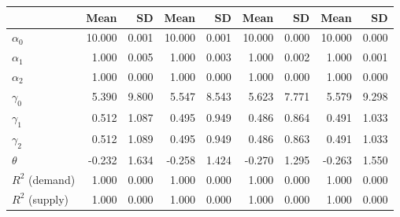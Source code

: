 
\begin{tabular}[t]{lrrrrrrrr}
\toprule
  & Mean & SD & Mean  & SD  & Mean   & SD   & Mean    & SD   \\
\midrule
$\alpha_{0}$ & 10.000 & 0.001 & 10.000 & 0.001 & 10.000 & 0.000 & 10.000 & 0.000\\
$\alpha_{1}$ & 1.000 & 0.005 & 1.000 & 0.003 & 1.000 & 0.002 & 1.000 & 0.001\\
$\alpha_{2}$ & 1.000 & 0.000 & 1.000 & 0.000 & 1.000 & 0.000 & 1.000 & 0.000\\
$\gamma_{0}$ & 5.390 & 9.800 & 5.547 & 8.543 & 5.623 & 7.771 & 5.579 & 9.298\\
$\gamma_{1}$ & 0.512 & 1.087 & 0.495 & 0.949 & 0.486 & 0.864 & 0.491 & 1.033\\
$\gamma_{2}$ & 0.512 & 1.089 & 0.495 & 0.949 & 0.486 & 0.863 & 0.491 & 1.033\\
$\theta$ & -0.232 & 1.634 & -0.258 & 1.424 & -0.270 & 1.295 & -0.263 & 1.550\\
$R^{2}$ (demand) & 1.000 & 0.000 & 1.000 & 0.000 & 1.000 & 0.000 & 1.000 & 0.000\\
$R^{2}$ (supply) & 1.000 & 0.000 & 1.000 & 0.000 & 1.000 & 0.000 & 1.000 & 0.000\\
\bottomrule
\end{tabular}
